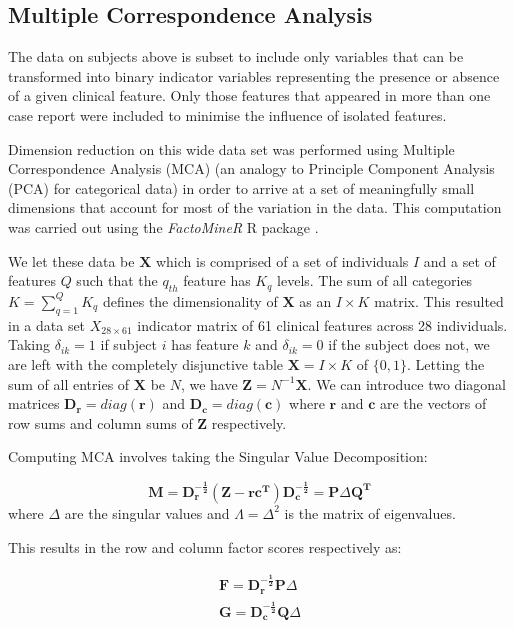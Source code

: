 \documentclass[
  authoryear,
  preprint,
  3p]{elsarticle}
\begin{document}
\hypertarget{multiple-correspondence-analysis}{%
\subsection{Multiple Correspondence
Analysis}\label{multiple-correspondence-analysis}}

The data on subjects above is subset to include only variables that can
be transformed into binary indicator variables representing the presence
or absence of a given clinical feature. Only those features that
appeared in more than one case report were included to minimise the
influence of isolated features.

Dimension reduction on this wide data set was performed using Multiple
Correspondence Analysis (MCA) (an analogy to Principle Component
Analysis (PCA) for categorical data) \citep{le2010multiple} in order to
arrive at a set of meaningfully small dimensions that account for most
of the variation in the data. This computation was carried out using the
\emph{FactoMineR} R package \citep{factominer}.

We let these data be \(\mathbf{X}\) which is comprised of a set of
individuals \(I\) and a set of features \(Q\) such that the \(q_{th}\)
feature has \(K_q\) levels. The sum of all categories
\(K = \sum_{q=1}^{Q}K_q\) defines the dimensionality of \(\mathbf{X}\)
as an \(I\times K\) matrix. This resulted in a data set
\(X_{28 \times 61}\) indicator matrix of 61 clinical features across 28
individuals. Taking \(\delta_{ik} = 1\) if subject \(i\) has feature
\(k\) and \(\delta_{ik} = 0\) if the subject does not, we are left with
the completely disjunctive table \(\mathbf{X} = I\times K\) of
\(\{0,1\}\). Letting the sum of all entries of \(\mathbf{X}\) be \(N\),
we have \(\mathbf{Z} = N^{-1}\mathbf{X}\). We can introduce two diagonal
matrices \(\mathbf{D_r} = diag(\mathbf{r})\) and
\(\mathbf{D_c} = diag(\mathbf{c})\) where \(\mathbf{r}\) and
\(\mathbf{c}\) are the vectors of row sums and column sums of
\(\mathbf{Z}\) respectively.

Computing MCA involves taking the Singular Value Decomposition:

\[
\mathbf{M = D_r^{-\frac{1}{2}}(Z-rc^T)D_c^{-\frac{1}{2}}} = \mathbf{P}\Delta\mathbf{Q^T}
\] where \(\Delta\) are the singular values and \(\Lambda = \Delta^2\)
is the matrix of eigenvalues.

This results in the row and column factor scores respectively as:

\[
\begin{split}
\mathbf{F} = \mathbf{D_r^{-\frac{1}{2}}P}\Delta \\
\mathbf{G = D_c^{-\frac{1}{2}}Q}\Delta
\end{split}
\]
\end{document}
